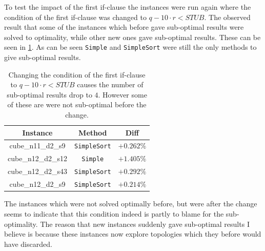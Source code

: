 To test the impact of the first if-clause the instances were run again where the
condition of the first if-clause was changed to $q - 10 \cdot r <
\textit{STUB}$. The observed result that some of the instances which before gave
sub-optimal results were solved to optimality, while other new ones gave
sub-optimal results. These can be seen in \cref{tab:correctness-errors-4}. As
can be seen \texttt{Simple} and \texttt{SimpleSort} were still the only methods
to give sub-optimal results.

\begin{table}[htbp]
  \centering
  \begin{tabular}{ccc}
    \toprule
    Instance           & Method              & Diff       \\
    \midrule
    cube\_n11\_d2\_s9  & \texttt{SimpleSort} & $+0.262\%$ \\
    cube\_n12\_d2\_s12 & \texttt{Simple}     & $+1.405\%$ \\
    cube\_n12\_d2\_s43 & \texttt{SimpleSort} & $+0.292\%$ \\
    cube\_n12\_d2\_s9  & \texttt{SimpleSort} & $+0.214\%$ \\
    \bottomrule
  \end{tabular}
  \caption[Sub-optimal results with condition $q - 10 \cdot r < \textit{STUB}$]{
    Changing the condition of the first if-clause to $q - 10 \cdot r <
    \textit{STUB}$ causes the number of sub-optimal results drop to $4$.
    However some of these are were not sub-optimal before the
    change.\label{tab:correctness-errors-4}}
\end{table}

The instances which were not solved optimally before, but were after the change
seems to indicate that this condition indeed is partly to blame for the
sub-optimality. The reason that new instances suddenly gave sub-optimal results
I believe is because these instances now explore topologies which they before
would have discarded.

